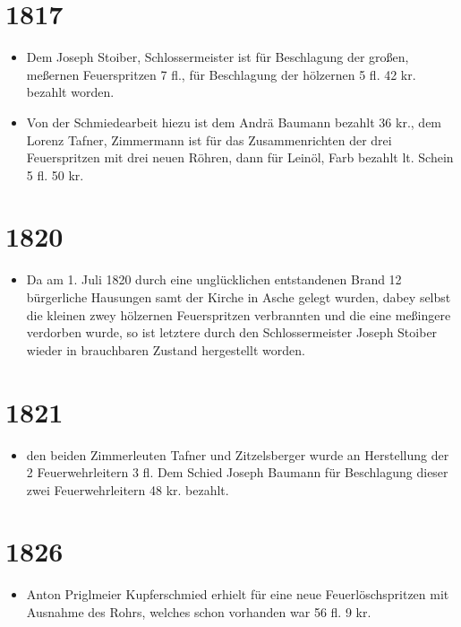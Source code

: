 \documentclass[12pt,a4paper]{book}
\begin{document}
\section*{1817}

\begin{itemize}
\item Dem Joseph Stoiber, Schlossermeister ist für Beschlagung der
großen, meßernen Feuerspritzen 7 fl., für Beschlagung der hölzernen 5
fl. 42 kr. bezahlt worden.

\item Von der Schmiedearbeit hiezu ist dem Andrä Baumann bezahlt 36 kr.,
dem Lorenz Tafner, Zimmermann ist für das Zusammenrichten der drei
Feuerspritzen mit drei neuen Röhren, dann für Leinöl, Farb bezahlt lt.
Schein 5 fl. 50 kr.
\end{itemize}

\section*{1820}

\begin{itemize}
\item Da am 1. Juli 1820 durch eine unglücklichen entstandenen Brand 12
bürgerliche Hausungen samt der Kirche in Asche gelegt wurden, dabey
selbst die kleinen zwey hölzernen Feuerspritzen verbrannten und die eine
meßingere verdorben wurde, so ist letztere durch den Schlossermeister
Joseph Stoiber wieder in brauchbaren Zustand hergestellt worden.
\end{itemize}

\section*{1821}

\begin{itemize}
\item den beiden Zimmerleuten Tafner und Zitzelsberger wurde an
Herstellung der 2 Feuerwehrleitern 3 fl. Dem Schied Joseph Baumann für
Beschlagung dieser zwei Feuerwehrleitern 48 kr. bezahlt.
\end{itemize}

\section*{1826}

\begin{itemize}
\item Anton Priglmeier Kupferschmied erhielt für eine neue
Feuerlöschspritzen mit Ausnahme des Rohrs, welches schon vorhanden war
56 fl. 9 kr.
\end{itemize}
\end{document}
